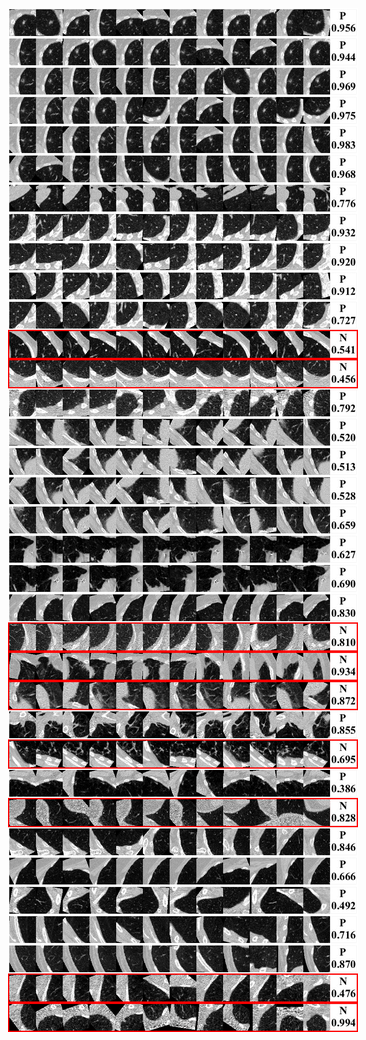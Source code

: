 \documentclass[onecolumn]{IEEEtran}
\begin{document}
\begin{figure}[H]
{\includegraphics[width=0.45\columnwidth]{./images/elcap-nodules-tail1}
}
\end{figure}
\newpage
\end{document}
